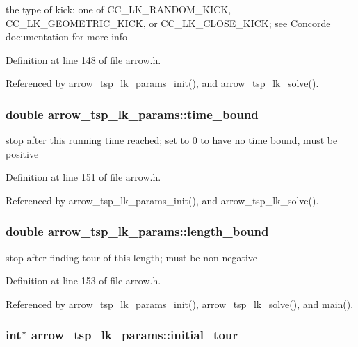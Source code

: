 the type of kick: one of CC\_\-LK\_\-RANDOM\_\-KICK, CC\_\-LK\_\-GEOMETRIC\_\-KICK, or CC\_\-LK\_\-CLOSE\_\-KICK; see Concorde documentation for more info 

Definition at line 148 of file arrow.h.

Referenced by arrow\_\-tsp\_\-lk\_\-params\_\-init(), and arrow\_\-tsp\_\-lk\_\-solve().\hypertarget{structarrow__tsp__lk__params_22355808165edb6033ca771b88917cf5}{
\subsubsection{\setlength{\rightskip}{0pt plus 5cm}double {\bf arrow\_\-tsp\_\-lk\_\-params::time\_\-bound}}}
\label{structarrow__tsp__lk__params_22355808165edb6033ca771b88917cf5}


stop after this running time reached; set to 0 to have no time bound, must be positive 

Definition at line 151 of file arrow.h.

Referenced by arrow\_\-tsp\_\-lk\_\-params\_\-init(), and arrow\_\-tsp\_\-lk\_\-solve().\hypertarget{structarrow__tsp__lk__params_36fb446a90e9b4c76702bd93f00357ea}{
\subsubsection{\setlength{\rightskip}{0pt plus 5cm}double {\bf arrow\_\-tsp\_\-lk\_\-params::length\_\-bound}}}
\label{structarrow__tsp__lk__params_36fb446a90e9b4c76702bd93f00357ea}


stop after finding tour of this length; must be non-negative 

Definition at line 153 of file arrow.h.

Referenced by arrow\_\-tsp\_\-lk\_\-params\_\-init(), arrow\_\-tsp\_\-lk\_\-solve(), and main().\hypertarget{structarrow__tsp__lk__params_1684519ac0bb6e529707b59f6cd7d528}{
\subsubsection{\setlength{\rightskip}{0pt plus 5cm}int$\ast$ {\bf arrow\_\-tsp\_\-lk\_\-params::initial\_\-tour}}}
\label{structarrow__tsp__lk__params_1684519ac0bb6e529707b59f6cd7d528}


